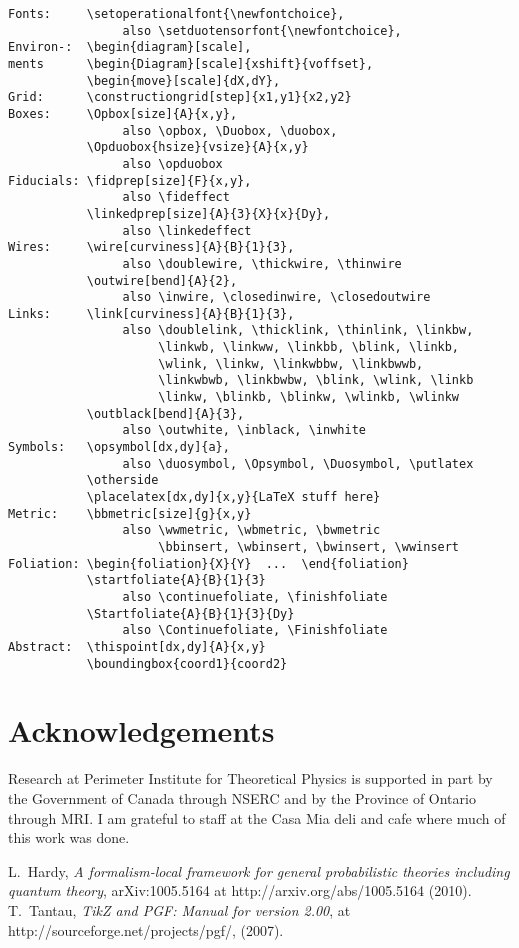 \documentclass[10pt]{article}
\begin{document}
\begin{verbatim}
Fonts:     \setoperationalfont{\newfontchoice},
                also \setduotensorfont{\newfontchoice},
Environ-:  \begin{diagram}[scale],
ments      \begin{Diagram}[scale]{xshift}{voffset},
           \begin{move}[scale]{dX,dY},
Grid:      \constructiongrid[step]{x1,y1}{x2,y2}
Boxes:     \Opbox[size]{A}{x,y},
                also \opbox, \Duobox, \duobox,
           \Opduobox{hsize}{vsize}{A}{x,y}
                also \opduobox
Fiducials: \fidprep[size]{F}{x,y},
                also \fideffect
           \linkedprep[size]{A}{3}{X}{x}{Dy},
                also \linkedeffect
Wires:     \wire[curviness]{A}{B}{1}{3},
                also \doublewire, \thickwire, \thinwire
           \outwire[bend]{A}{2},
                also \inwire, \closedinwire, \closedoutwire
Links:     \link[curviness]{A}{B}{1}{3},
                also \doublelink, \thicklink, \thinlink, \linkbw,
                     \linkwb, \linkww, \linkbb, \blink, \linkb,
                     \wlink, \linkw, \linkwbbw, \linkbwwb,
                     \linkwbwb, \linkbwbw, \blink, \wlink, \linkb
                     \linkw, \blinkb, \blinkw, \wlinkb, \wlinkw
           \outblack[bend]{A}{3},
                also \outwhite, \inblack, \inwhite
Symbols:   \opsymbol[dx,dy]{a},
                also \duosymbol, \Opsymbol, \Duosymbol, \putlatex
           \otherside
           \placelatex[dx,dy]{x,y}{LaTeX stuff here}
Metric:    \bbmetric[size]{g}{x,y}
                also \wwmetric, \wbmetric, \bwmetric
                     \bbinsert, \wbinsert, \bwinsert, \wwinsert
Foliation: \begin{foliation}{X}{Y}  ...  \end{foliation}
           \startfoliate{A}{B}{1}{3}
                also \continuefoliate, \finishfoliate
           \Startfoliate{A}{B}{1}{3}{Dy}
                also \Continuefoliate, \Finishfoliate
Abstract:  \thispoint[dx,dy]{A}{x,y}
           \boundingbox{coord1}{coord2}
\end{verbatim}


\vspace{7mm}

\section*{Acknowledgements}
Research at Perimeter Institute for Theoretical Physics is supported in part by
the Government of Canada through NSERC and by the Province of Ontario
through MRI.  I am grateful to staff at the Casa Mia deli and cafe where much of this work was done.  

\begin{thebibliography}{00}
 L.\ Hardy, {\it A formalism-local framework for general probabilistic theories including quantum theory}, arXiv:1005.5164 at http://arxiv.org/abs/1005.5164 (2010).
 T.\ Tantau, {\it TikZ and PGF: Manual for version 2.00}, at http://sourceforge.net/projects/pgf/, (2007).
\end{thebibliography}
\end{document}
